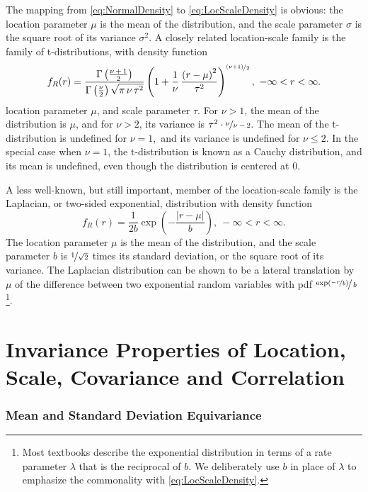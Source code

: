 \documentclass[graybox,envcountchap,sectrefs]{svmono}\usepackage[]{graphicx}\usepackage[]{xcolor}
\begin{document}
\begin{appendices}
The mapping from \eqref{eq:NormalDensity} to \eqref{eq:LocScaleDensity}
is obvious: the location parameter $\mu$ is the mean of the distribution,
and the scale parameter $\sigma$ is the square root of its variance
$\sigma^{2}$. A closely related location-scale family is the family
of t-distributions, with density function
\begin{equation}
f_{R}(r)=\frac{\Gamma\left(\frac{\nu\,+\,1}{2}\right)}{\Gamma\left(\frac{\nu}{2}\right)\sqrt{\pi\,\nu\,\tau^{2}}}\left(1+\frac{1}{\nu}\,\frac{\left(r-\mu\right)^{2}}{\tau^{2}}\right)^{\nicefrac{\left(\nu+1\right)}{2}},\ -\infty<r<\infty.\label{eq:tDensity}
\end{equation}
location parameter $\mu$, and scale parameter $\tau$. For $\nu>1$,
the mean of the distribution is $\mu$, and for $\nu>2$, its variance
is $\tau^{2}\cdot\nicefrac{\nu}{\nu\,-\,2}$. The mean of the t-distribution
is undefined for $\nu=1,$ and its variance is undefined for $\nu\leqslant2$.
In the special case when $\nu=1$, the t-distribution is known as
a Cauchy distribution, and its mean is undefined, even though the
distribution is centered at 0.

A less well-known, but still important, member of the location-scale
family is the Laplacian, or two-sided exponential, distribution with
density function
\begin{equation}
f_{R}(r)=\frac{1}{2b}\exp\left(-\frac{\left|r-\mu\right|}{b}\right),\ -\infty<r<\infty.\label{eq:LaplacianDensity}
\end{equation}
The location parameter $\mu$ is the mean of the distribution, and
the scale parameter $b$ is $\nicefrac{1}{\sqrt{2}}$ times its standard
deviation, or the square root of its variance. The Laplacian distribution
can be shown to be a lateral translation by $\mu$ of the difference
between two exponential random variables with pdf $\nicefrac{\exp\left(\nicefrac{-r}{b}\right)}{\,b}$\footnote{Most textbooks describe the exponential distribution in terms of a
rate parameter $\lambda$ that is the reciprocal of $b$. We deliberately
use $b$ in place of $\lambda$ to emphasize the commonality with
\ref{eq:LocScaleDensity}.}.


\section{Invariance Properties of Location, Scale, Covariance and Correlation}

\subsubsection*{Mean and Standard Deviation Equivariance}


\end{appendices}
\end{document}
